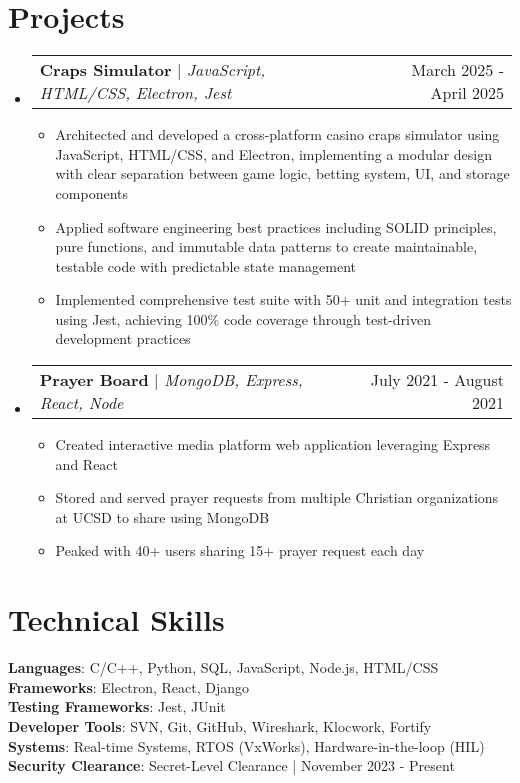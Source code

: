 \documentclass[letterpaper,11pt]{article}
\makeatletter
\newcommand{\resumeItem}[1]{
  \item\small{
    {#1 \vspace{-2pt}}
  }
}
\newcommand{\resumeProjectHeading}[2]{
    \item
    \begin{tabular*}{0.97\textwidth}{l@{\extracolsep{\fill}}r}
      \small#1 & #2 \\
    \end{tabular*}\vspace{-7pt}
}
\newcommand{\resumeSubHeadingListStart}{\begin{itemize}[leftmargin=0.15in, label={}]}
\newcommand{\resumeSubHeadingListEnd}{\end{itemize}}
\newcommand{\resumeItemListStart}{\begin{itemize}}
\newcommand{\resumeItemListEnd}{\end{itemize}\vspace{-5pt}}
\makeatother
\begin{document}
\section{Projects}
    \resumeSubHeadingListStart
      \resumeProjectHeading
          {\textbf{Craps Simulator} $|$ \emph{JavaScript, HTML/CSS, Electron, Jest}}{March 2025 - April 2025}
          \resumeItemListStart
            \resumeItem{Architected and developed a cross-platform casino craps simulator using JavaScript, HTML/CSS, and Electron, implementing a modular design with clear separation between game logic, betting system, UI, and storage components} 
            \resumeItem{Applied software engineering best practices including SOLID principles, pure functions, and immutable data patterns to create maintainable, testable code with predictable state management}
            \resumeItem{Implemented comprehensive test suite with 50+ unit and integration tests using Jest, achieving 100\% code coverage through test-driven development practices}

          \resumeItemListEnd
      \resumeProjectHeading
          {\textbf{Prayer Board} $|$ \emph{MongoDB, Express, React, Node}}{July 2021 - August 2021}
          \resumeItemListStart
            \resumeItem{Created interactive media platform web application leveraging Express and React}
            \resumeItem{Stored and served prayer requests from multiple Christian organizations at UCSD to share using MongoDB}
            \resumeItem{Peaked with 40+ users sharing 15+ prayer request each day}
          \resumeItemListEnd
    \resumeSubHeadingListEnd

\section{Technical Skills}
 \begin{itemize}[leftmargin=0.15in, label={}]
    \small{\item{
     \textbf{Languages}{: C/C++, Python, SQL, JavaScript, Node.js, HTML/CSS} \\
     \textbf{Frameworks}{: Electron, React, Django} \\
     \textbf{Testing Frameworks}{: Jest, JUnit} \\
     \textbf{Developer Tools}{: SVN, Git, GitHub, Wireshark, Klocwork, Fortify} \\
     \textbf{Systems}{: Real-time Systems, RTOS (VxWorks), Hardware-in-the-loop (HIL)} \\ 
     \textbf{Security Clearance}{: Secret-Level Clearance | November 2023 - Present}
    }}
 \end{itemize}

\end{document}

